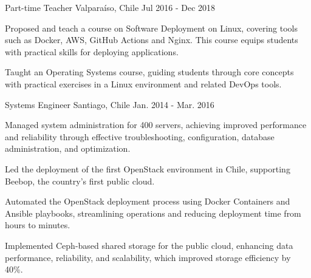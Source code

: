\begin{cventries}
   {Part-time Teacher}
  {Valparaíso, Chile} {Jul 2016 - Dec 2018}
  { \begin{cvitems}\item{Proposed and teach a course on Software Deployment on Linux, covering tools such as Docker, AWS, GitHub Actions and Nginx. This course equips students with practical skills for deploying applications.} \item{Taught an Operating Systems course, guiding students through core concepts with practical exercises in a Linux environment and related DevOps tools.}\end{cvitems} }


   {Systems Engineer} {Santiago, Chile} {Jan. 2014 - Mar. 2016}
  { \begin{cvitems}\item{Managed system administration for 400 servers, achieving improved performance and reliability through effective troubleshooting, configuration, database administration, and optimization.} \item{Led the deployment of the first OpenStack environment in Chile, supporting Beebop, the country's first public cloud.} \item{Automated the OpenStack deployment process using Docker Containers and Ansible playbooks, streamlining operations and reducing deployment time from hours to minutes.} \item{Implemented Ceph-based shared storage for the public cloud, enhancing data performance, reliability, and scalability, which improved storage efficiency by 40\%.}\end{cvitems} }

\end{cventries}